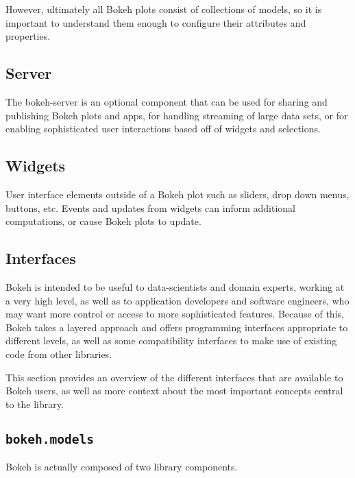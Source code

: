 \documentclass[a4paper,12pt]{article}
\begin{document}
However, ultimately all Bokeh plots consist of collections of models, so it is important to understand them enough to configure their attributes and properties. 

\subsection*{Server}
The bokeh-server is an optional component that can be used for sharing and publishing Bokeh plots and apps, for handling streaming of large data sets, or for enabling sophisticated user interactions based off of widgets and selections. 

\subsection*{Widgets}
User interface elements outside of a Bokeh plot such as sliders, drop down menus, buttons, etc. Events and updates from widgets can inform additional computations, or cause Bokeh plots to update.

\subsection*{Interfaces}
Bokeh is intended to be useful to data-scientists and domain experts, working at a very high level, as well as to application developers and software engineers, who may want more control or access to more sophisticated features. Because of this, Bokeh takes a layered approach and offers programming interfaces appropriate to different levels, as well as some compatibility interfaces to make use of existing code from other libraries. 

This section provides an overview of the different interfaces that are available to Bokeh users, as well as more context about the most important concepts central to the library. 
\newpage

\subsection{\texttt{bokeh.models}}
Bokeh is actually composed of two library components.
\end{document}
